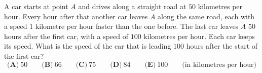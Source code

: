 A car starts at point $A$ and drives along a straight road at $50$ kilometres per hour. Every hour after that another car leaves $A$ along the same road, each with a speed $1$ kilometre per hour faster than the one before. The last car leaves $A$ $50$ hours after the first car, with a speed of $100$ kilometres per hour. Each car keeps its speed. What is the speed of the car that is leading $100$ hours after the start of the first car?
\[\textbf{(A)}\ 50\qquad\textbf{(B)}\ 66\qquad\textbf{(C)}\ 75\qquad\textbf{(D)}\ 84\qquad\textbf{(E)}\ 100\qquad\text{(in kilometres per hour)}\]
